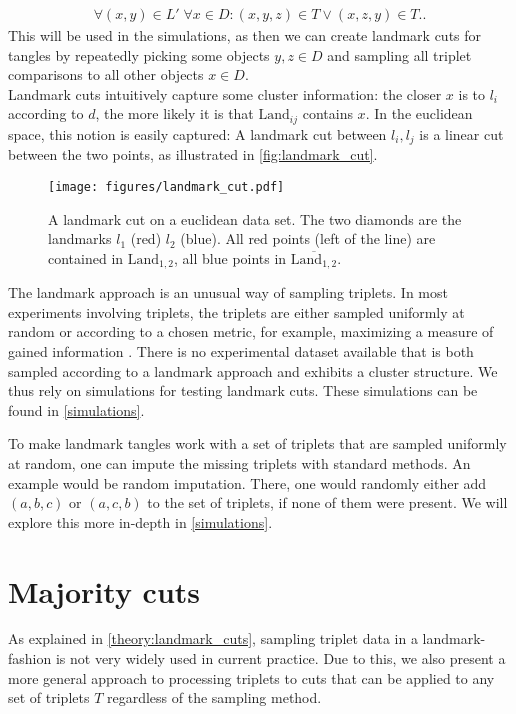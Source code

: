 \begin{align*}
    \forall (x,y) \in L' \; \forall x \in D: (x, y, z) \in T \vee (x, z, y) \in T.
.\end{align*}
This will be used in the simulations, as then we can create landmark cuts for tangles by 
repeatedly picking some objects $y, z \in D$ and sampling all triplet comparisons to all other objects $x \in D$. \\

Landmark cuts intuitively capture some cluster information: 
the closer $x$ is to $l_i$ according to $d$, the more likely it is that $\text{Land}_{ij}$ contains $x$. 
In the euclidean space, this notion is easily captured: A landmark cut between $l_i, l_j$ is
a linear cut between the two points, as illustrated in \autoref{fig:landmark_cut}.

    \begin{figure}[ht]
        \centering
        \texttt{[image: figures/landmark\_cut.pdf]}
        \caption{A landmark cut on a euclidean data set. The two diamonds 
            are the landmarks $l_1$ (red) $l_2$ (blue). All red points (left of the line) 
            are contained in $\text{Land}_{1,2}$, all blue points in $\overline{\text{Land} _{1,2}}$.}
        \label{fig:landmark_cut}
    \end{figure}

The landmark approach is an unusual way of sampling triplets.
In most experiments involving triplets, the triplets are either sampled uniformly at random
\citep{kleindessnerLensDepthFunction2017, haghiriEstimationPerceptualScales2020} 
or according to a chosen metric, for example, maximizing a measure of gained information \citep{roadsEnrichingImageNetHuman2021}. 
There is no experimental dataset available that is both sampled according to a landmark approach and exhibits a cluster structure. 
We thus rely on simulations for testing landmark cuts. These simulations can be found in \autoref{simulations}.

To make landmark tangles work with a set of triplets that are sampled uniformly at random, one can impute the missing triplets with standard methods.
An example would be random imputation. There, one would randomly either add $(a,b,c)$ or $(a,c,b)$ to the set of triplets, if none of them were present.
We will explore this more in-depth in \autoref{simulations}.

\section{Majority cuts}\label{theory:majority_cuts}
As explained in \autoref{theory:landmark_cuts}, sampling triplet data in a landmark-fashion is not very widely used in current practice. Due to this, we 
also present a more general approach to processing triplets to cuts that can be applied to any set of triplets $T$ regardless of the sampling method.

